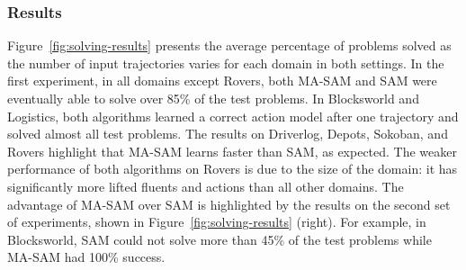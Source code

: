 \documentclass[letterpaper]{article} %
\theoremstyle{definition}
\theoremstyle{remark}
\newcommand{\sam}{\ac{SAM}\xspace}
\newcommand{\masam}{\ac{MA-SAM}\xspace}
\begin{document}





\subsubsection{Results}
\label{sec:results}

Figure~\ref{fig:solving-results} presents the average percentage of problems solved as the number of input trajectories varies for each domain in both settings.
In the first experiment, in all domains except Rovers, both \masam and \sam were eventually able to solve over 85\% of the test problems.
In Blocksworld and Logistics, both algorithms learned a correct action model after one trajectory and solved almost all test problems.
The results on Driverlog, Depots, Sokoban, and Rovers highlight that  \masam learns faster than \sam, as expected. %
The weaker performance of both algorithms on Rovers is due to the size of the domain: it has significantly more lifted fluents and actions than all other domains.
The advantage of \masam over \sam is highlighted by the results on the second set of experiments, shown in Figure~\ref{fig:solving-results} (right).
For example, in Blocksworld, \sam could not solve more than 45\% of the test problems while \masam had 100\% success.
\end{document}

